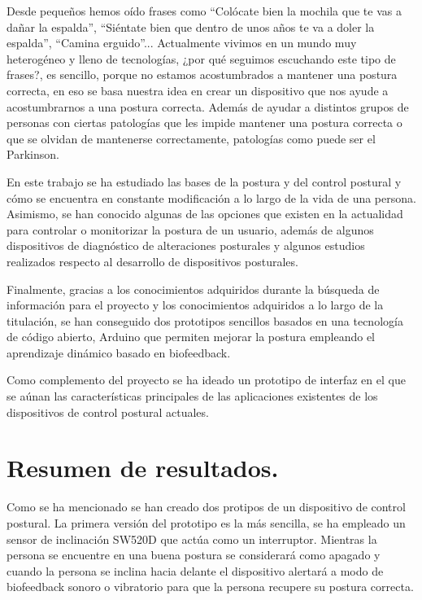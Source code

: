 
Desde pequeños hemos oído frases como ``Colócate bien la mochila que te vas a dañar la espalda'', ``Siéntate bien que dentro de unos años te va a doler la espalda'', ``Camina erguido''... Actualmente vivimos en un mundo muy heterogéneo y lleno de tecnologías, ¿por qué seguimos escuchando este tipo de frases?, es sencillo, porque no estamos acostumbrados a mantener una postura correcta, en eso se basa nuestra idea en crear un dispositivo que nos ayude a acostumbrarnos a una postura correcta. Además de ayudar a distintos grupos de personas con ciertas patologías que les impide mantener una postura correcta o que se olvidan de mantenerse correctamente, patologías como puede ser el Parkinson. 

En este trabajo se ha estudiado las bases de la postura y del control postural y cómo se encuentra en constante modificación a lo largo de la vida de una persona. Asimismo, se han conocido algunas de las opciones que existen en la actualidad para controlar o monitorizar la postura de un usuario, además de algunos dispositivos de diagnóstico de alteraciones posturales y algunos estudios realizados respecto al desarrollo de dispositivos posturales.

Finalmente, gracias a los conocimientos adquiridos durante la búsqueda de información para el proyecto y los conocimientos adquiridos a lo largo de la titulación, se han conseguido dos prototipos sencillos basados en una tecnología de código abierto, Arduino que permiten mejorar la postura empleando el aprendizaje dinámico basado en biofeedback. 

Como complemento del proyecto se ha ideado un prototipo de interfaz en el que se aúnan las características principales de las aplicaciones existentes de los dispositivos de control postural actuales.


\section{Resumen de resultados.}

Como se ha mencionado se han creado dos protipos de un dispositivo de control postural. La primera versión del prototipo es la más sencilla, se ha empleado un sensor de inclinación SW520D que actúa como un interruptor. Mientras la persona se encuentre en una buena postura se considerará como apagado y cuando la persona se inclina hacia delante el dispositivo alertará a modo de biofeedback sonoro o vibratorio para que la persona recupere su postura correcta. 

